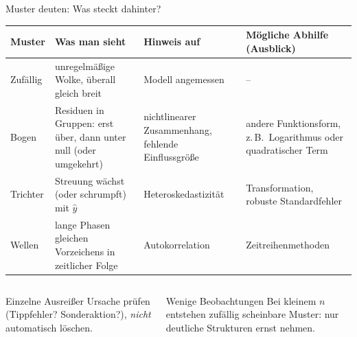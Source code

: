 \documentclass[aspectratio=169,11pt]{beamer}
\begin{document}
\begin{frame}{Muster deuten: Was steckt dahinter?}
  \footnotesize
  \begin{center}
    \renewcommand{\arraystretch}{1.12}
    \begin{tabular}{@{}L{1.7cm} L{4.1cm} L{3.6cm} L{4.1cm}@{}}
      \toprule
      \textbf{Muster} & \textbf{Was man sieht} & \textbf{Hinweis auf} & \textbf{Mögliche Abhilfe (Ausblick)} \\
      \midrule
      Zufällig & unregelmäßige Wolke, überall gleich breit
        & Modell angemessen & -- \\
      Bogen & Residuen in Gruppen: erst über, dann unter null (oder umgekehrt)
        & nichtlinearer Zusammenhang, fehlende Einflussgröße
        & andere Funktionsform, z.\,B.\ Logarithmus oder quadratischer Term \\
      Trichter & Streuung wächst (oder schrumpft) mit $\hat{y}$
        & Heteroskedastizität & Transformation, robuste Standardfehler \\
      Wellen & lange Phasen gleichen Vorzeichens in zeitlicher Folge
        & Autokorrelation & Zeitreihenmethoden \\
      \bottomrule
    \end{tabular}
  \end{center}

  \begin{columns}[T]
    \begin{column}{0.49\textwidth}
      \begin{alertblock}{Einzelne Ausreißer}
        Ursache prüfen (Tippfehler? Sonderaktion?), \emph{nicht} automatisch löschen.
      \end{alertblock}
    \end{column}
    \begin{column}{0.49\textwidth}
      \begin{exampleblock}{Wenige Beobachtungen}
        Bei kleinem $n$ entstehen zufällig scheinbare Muster: nur
        deutliche Strukturen ernst nehmen.
      \end{exampleblock}
    \end{column}
  \end{columns}
\end{frame}
\end{document}
